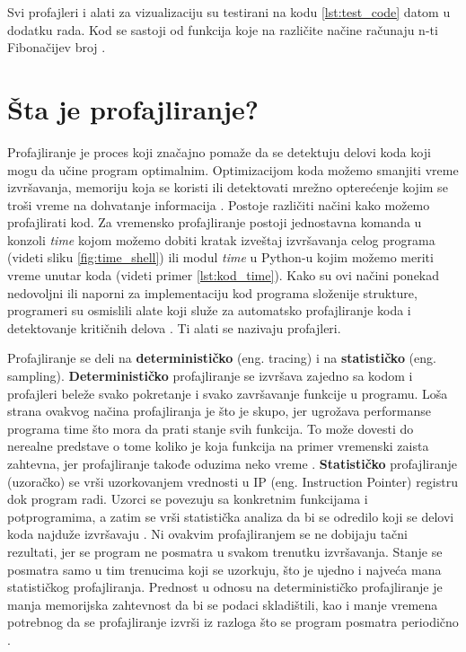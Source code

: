 \documentclass[a4paper]{article}
\begin{document}
Svi profajleri i alati za vizualizaciju su testirani na kodu \ref{lst:test_code} datom u dodatku rada. Kod se sastoji od funkcija koje na različite načine računaju n-ti Fibonačijev broj \cite{fib}.

\section{Šta je profajliranje?}	
\label{sec:profajliranje}

Profajliranje je proces koji značajno pomaže da se detektuju delovi koda koji mogu da učine program optimalnim. Optimizacijom koda možemo smanjiti vreme izvršavanja, memoriju koja se koristi ili detektovati mrežno opterećenje kojim se troši vreme na dohvatanje informacija \cite{mit}. Postoje različiti načini kako možemo profajlirati kod. Za vremensko profajliranje postoji jednostavna komanda u konzoli {\em time} kojom možemo dobiti kratak izveštaj izvršavanja celog programa (videti sliku \ref{fig:time_shell}) ili modul {\em time} u Python-u kojim možemo meriti vreme unutar koda (videti primer \ref{lst:kod_time}). Kako su ovi načini ponekad nedovoljni ili naporni za implementaciju kod programa složenije strukture, programeri su osmislili alate koji služe za automatsko profajliranje koda i detektovanje kritičnih delova \cite{vanderplas2016python}. Ti alati se nazivaju profajleri.

Profajliranje se deli na \textbf{determinističko} (eng. tracing) i na \textbf{statističko} (eng. sampling). \textbf{Determinističko} profajliranje se izvršava zajedno sa kodom i profajleri beleže svako pokretanje i svako završavanje funkcije u programu. Loša strana ovakvog načina profajliranja je što je skupo, jer ugrožava performanse programa time što mora da prati stanje svih funkcija. To može dovesti do nerealne predstave o tome koliko je koja funkcija na primer vremenski zaista zahtevna, jer profajliranje takođe oduzima neko vreme \cite{deterministic}. \textbf{Statističko} profajliranje (uzoračko) se vrši uzorkovanjem vrednosti u IP (eng. Instruction Pointer) registru dok program radi. Uzorci se povezuju sa konkretnim funkcijama i potprogramima, a zatim se vrši statistička analiza da bi se odredilo koji se delovi koda najduže izvršavaju \cite{StatProf1}. Ni ovakvim profajliranjem se ne dobijaju tačni rezultati, jer se program ne posmatra u svakom trenutku izvršavanja. Stanje se posmatra samo u tim trenucima koji se uzorkuju, što je ujedno i najveća mana statističkog profajliranja. Prednost u odnosu na determinističko profajliranje je manja memorijska zahtevnost da bi se podaci skladištili, kao i manje vremena potrebnog da se profajliranje izvrši iz razloga što se program posmatra periodično \cite{StatProf2}.
\end{document}
